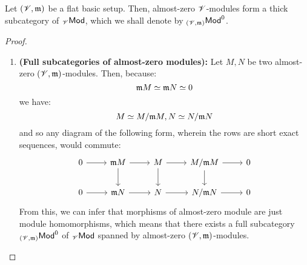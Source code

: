                     \begin{proposition} \label{prop: thick_subcategories_of_almost_zero_modules}
                        Let $(\mathscr{V}, \mathfrak{m})$ be a flat basic setup. Then, almost-zero $\mathscr{V}$-modules form a thick subcategory of ${}_{\mathscr{V}}\mathsf{Mod}$, which we shall denote by ${}_{(\mathscr{V}, \mathfrak{m})}\mathsf{Mod}^0$.
                    \end{proposition}
                        \begin{proof}
                            \noindent
                            \begin{enumerate}
                                \item \textbf{(Full subcategories of almost-zero modules):} Let $M, N$ be two almost-zero $(\mathscr{V}, \mathfrak{m})$-modules. Then, because:
                                    $$\mathfrak{m} M \simeq \mathfrak{m} N \simeq 0$$
                                we have:
                                    $$M \simeq M/\mathfrak{m} M, N \simeq N/\mathfrak{m} N$$
                                and so any diagram of the following form, wherein the rows are short exact sequences, would commute:
                                    $$
                                        \begin{tikzcd}
                                        	0 & {\m M} & M & {M/\m M} & 0 \\
                                        	0 & {\m N} & N & {N/ \m N} & 0
                                        	\arrow[from=1-1, to=1-2]
                                        	\arrow[from=1-2, to=1-3]
                                        	\arrow[from=1-3, to=1-4]
                                        	\arrow[from=1-4, to=1-5]
                                        	\arrow[from=2-1, to=2-2]
                                        	\arrow[from=2-2, to=2-3]
                                        	\arrow[from=2-3, to=2-4]
                                        	\arrow[from=2-4, to=2-5]
                                        	\arrow[from=1-2, to=2-2]
                                        	\arrow[from=1-3, to=2-3]
                                        	\arrow[from=1-4, to=2-4]
                                        \end{tikzcd}
                                    $$
                                From this, we can infer that morphisms of almost-zero module are just module homomorphisms, which means that there exists a full subcategory ${}_{(\mathscr{V}, \mathfrak{m})}\mathsf{Mod}^0$ of ${}_{\mathscr{V}}\mathsf{Mod}$ spanned by almost-zero $(\mathscr{V}, \mathfrak{m})$-modules.

\end{enumerate}
\end{proof}
